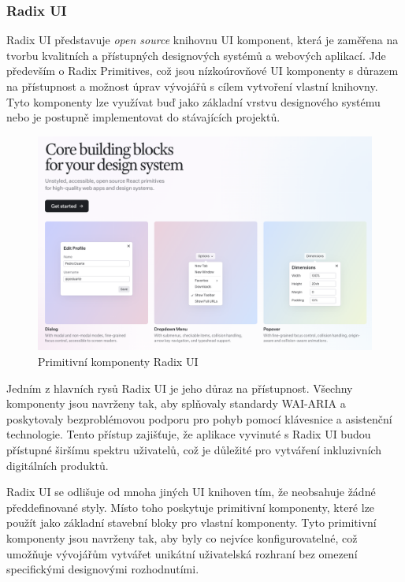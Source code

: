 \clearpage

\subsubsection{Radix UI}
Radix UI představuje \emph{open source} knihovnu UI komponent, která je zaměřena na tvorbu kvalitních a přístupných designových systémů a webových aplikací.
Jde především o Radix Primitives, což jsou nízkoúrovňové UI komponenty s důrazem na přístupnost a možnost úprav vývojářů s cílem vytvoření vlastní knihovny.
Tyto komponenty lze využívat buď jako základní vrstvu designového systému nebo je postupně implementovat do stávajících projektů. \cite{RadixUIPrimitives}

\begin{figure}[H]
    \includegraphics[width=\textwidth]{images/radix-ui}
    \caption{Primitivní komponenty Radix UI} \label{picture:radix-ui}
\end{figure}

Jedním z hlavních rysů Radix UI je jeho důraz na přístupnost. Všechny komponenty jsou navrženy tak, aby splňovaly standardy WAI-ARIA a poskytovaly bezproblémovou podporu pro pohyb pomocí klávesnice a asistenční technologie. Tento přístup zajišťuje, že aplikace vyvinuté s Radix UI budou přístupné širšímu spektru uživatelů, což je důležité pro vytváření inkluzivních digitálních produktů.

Radix UI se odlišuje od mnoha jiných UI knihoven tím, že neobsahuje žádné předdefinované styly. Místo toho poskytuje primitivní komponenty, které lze použít jako základní stavební bloky pro vlastní komponenty. Tyto primitivní komponenty jsou navrženy tak, aby byly co nejvíce konfigurovatelné, což umožňuje vývojářům vytvářet unikátní uživatelská rozhraní bez omezení specifickými designovými rozhodnutími.

